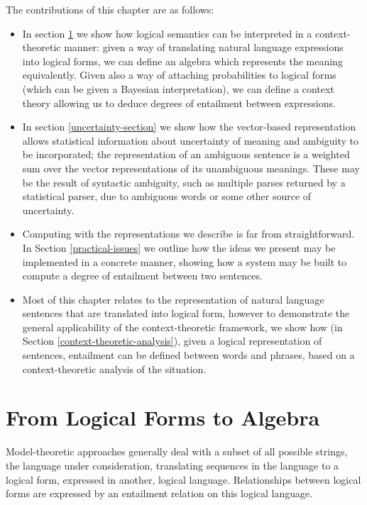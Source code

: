The contributions of this chapter are as follows:
\begin{itemize}
\item In section \ref{logical-projections} we show how logical semantics can be interpreted in a context-theoretic manner: given a way of translating natural language expressions into logical forms, we can define an algebra which represents the meaning equivalently. Given also a way of attaching probabilities to logical forms (which can be given a Bayesian interpretation), we can define a context theory allowing us to deduce degrees of entailment between expressions.
\item In section \ref{uncertainty-section} we show how the vector-based representation allows statistical information about uncertainty of meaning and ambiguity to be incorporated; the representation of an ambiguous sentence is a weighted sum over the vector representations of its unambiguous meanings. These may be the result of syntactic ambiguity, such as multiple parses returned by a statistical parser, due to ambiguous words or some other source of uncertainty. 
\item Computing with the representations we describe is far from straightforward. In Section \ref{practical-issues} we outline how the ideas we present may be implemented in a concrete manner, showing how a system may be built to compute a degree of entailment between two sentences.
\item Most of this chapter relates to the representation of natural language sentences that are translated into logical form, however to demonstrate the general applicability of the context-theoretic framework, we show how (in Section \ref{context-theoretic-analysis}), given a logical representation of sentences, entailment can be defined between words and phrases, based on a context-theoretic analysis of the situation.
\end{itemize}

\section{From Logical Forms to Algebra}
\label{logical-projections}

Model-theoretic approaches generally deal with a subset of all possible strings, the language under consideration, translating sequences in the language to a logical form, expressed in another, logical language. Relationships between logical forms are expressed by an entailment relation on this logical language.

